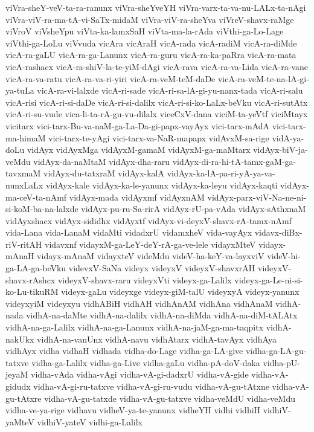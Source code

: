 {viVra-sheY-veV-ta-ra-ranunx
viVra-sheYveYH
viVra-varx-ta-va-nu-LALx-ta-nAgi
viVra-viV-ra-ma-tA-vi-SaTx-midaM
viVra-viV-ra-sheYva
viVreV-shavx-raMge
viVroV
viVsheYpu
viVta-ka-lamxSaH
viVta-ma-la-rAda
viVthi-ga-Lo-Lage
viVthi-ga-LoLu
viVvuda
vicAra
vicAraH
vicA-rada
vicA-radiM
vicA-ra-diMde
vicA-ra-gaLU
vicA-ra-ga-Lanunx
vicA-ra-guru
vicA-ra-ka-paRra
vicA-ra-mata
vicA-rashacx
vicA-ra-shiV-la-te-yiM-dAgi
vicA-rava
vicA-ra-va-Lida
vicA-ra-vane
vicA-ra-va-ratu
vicA-ra-va-ri-yiri
vicA-ra-veM-teM-daDe
vicA-ra-veM-te-na-lA-gi-ya-tuLa
vicA-ra-vi-lalxde
vicA-ri-sade
vicA-ri-sa-lA-gi-yu-nanx-tada
vicA-ri-salu
vicA-risi
vicA-ri-si-daDe
vicA-ri-si-dalilx
vicA-ri-si-ko-LaLx-beVku
vicA-ri-sutAtx
vicA-ri-su-vude
vica-li-ta-rA-gu-vu-dilalx
viceCxV-dana
viciM-ta-yeVtf
viciMtayx
vicitarx
vici-tarx-Bu-va-naM-ga-La-Da-gi-papx-vayAyx
vici-tarx-mAdA
vici-tarx-ma-himaM
vici-tarx-te-yAgi
vici-tarx-va-NaR-mapapx
vidAvxM-sa-rige
vidA-ya-doLu
vidAyx
vidAyxMga
vidAyxM-gamaM
vidAyxM-ga-maMtarx
vidAyx-biV-ja-veMdu
vidAyx-da-naMtaM
vidAyx-dha-raru
vidAyx-di-ra-hi-tA-tamx-gaM-ga-tavxmaM
vidAyx-du-tatxraM
vidAyx-kalA
vidAyx-ka-lA-pa-ri-yA-ya-va-nunxLaLx
vidAyx-kale
vidAyx-ka-le-yanunx
vidAyx-ka-leyu
vidAyx-kaqti
vidAyx-ma-ceV-ta-nAmf
vidAyx-mada
vidAyxmf
vidAyxnAM
vidAyx-parx-viV-Na-ne-ni-si-koM-ba-na-lalxde
vidAyx-pu-ru-Sa-rirA
vidAyx-rU-pa-vAda
vidAyx-sAthxnaM
vidAyxshacx
vidAyx-sididhx
vidAyxtf
vidAyx-vi-deyxV-shavx-rA-tamx-nAmf
vida-Lana
vida-LanaM
vidaMti
vidadxrU
vidamxheV
vida-vayAyx
vidavx-diBx-riV-ritAH
vidavxnf
vidayxM-ga-LeY-deY-rA-ga-ve-lele
vidayxMteV
vidayx-mAnaH
vidayx-mAnaM
vidayxteV
videMdu
videV-ha-keY-va-layxviV
videV-hi-ga-LA-ga-beVku
videvxV-SaNa
videyx
videyxV
videyxV-shavxrAH
videyxV-shavx-rAshcx
videyxV-shavx-raru
videyxVti
videyx-ga-Lalilx
videyx-ga-Le-ni-si-ko-Lu-tikuRM
videyx-gaLu
videyxge
videyx-giM-talU
videyxyA
videyx-yanunx
videyxyiM
videyxyu
vidhABiH
vidhAH
vidhAnAM
vidhAna
vidhAnaM
vidhA-nada
vidhA-na-daMte
vidhA-na-dalilx
vidhA-na-diMda
vidhA-na-diM-tALAtx
vidhA-na-ga-Lalilx
vidhA-na-ga-Lanunx
vidhA-na-jaM-ga-ma-taqpitx
vidhA-nakUkx
vidhA-na-vanUnx
vidhA-navu
vidhAtarx
vidhA-tavAyx
vidhAya
vidhAyx
vidha
vidhaH
vidhada
vidha-do-Lage
vidha-ga-LA-give
vidha-ga-LA-gu-tatxve
vidha-ga-Lalilx
vidha-ga-Live
vidha-gaLu
vidha-pA-doV-daka
vidha-pU-jeyaM
vidha-vAda
vidha-vAgi
vidha-vA-gi-dadxrU
vidha-vA-gide
vidha-vA-gidudx
vidha-vA-gi-ru-tatxve
vidha-vA-gi-ru-vudu
vidha-vA-gu-tAtxne
vidha-vA-gu-tAtxre
vidha-vA-gu-tatxde
vidha-vA-gu-tatxve
vidha-veMdU
vidha-veMdu
vidha-ve-ya-rige
vidhavu
vidheV-ya-te-yanunx
vidheYH
vidhi
vidhiH
vidhiV-yaMteV
vidhiV-yateV
vidhi-ga-Lalilx
}
